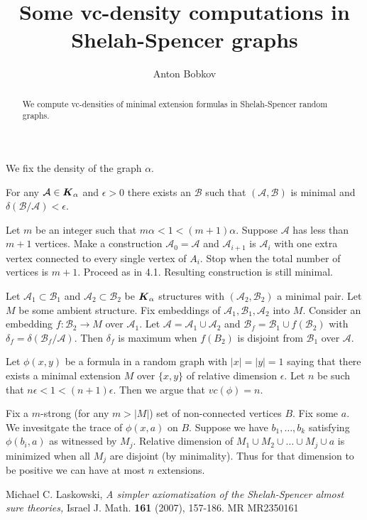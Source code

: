 \documentclass{amsart}
\newcommand{\A}{\mathcal A}
\newcommand{\B}{\mathcal B}
\newcommand{\K}{\boldface K_\alpha}
\begin{document}
\title{Some vc-density computations in Shelah-Spencer graphs}
\author{Anton Bobkov}

\begin{abstract}
	We compute vc-densities of minimal extension formulas in Shelah-Spencer random graphs.
\end{abstract}

\maketitle

We fix the density of the graph $\alpha$.

\begin{Lemma}
	For any $\A \in \K$ and $\epsilon > 0$ there exists an $\B$ such that $(\A, \B)$ is minimal and $\delta(\B/\A) < \epsilon$.
\end{Lemma}

\begin{Proof}
	Let $m$ be an integer such that $m\alpha < 1 < (m+1)\alpha$. Suppose $\A$ has less than $m+1$ vertices. Make a construction $\A_0 = \A$ and $\A_{i+1}$ is $\A_i$ with one extra vertex connected to every single vertex of $A_i$. Stop when the total number of vertices is $m+1$. Proceed as in \cite{Laskowski} 4.1. Resulting construction is still minimal.
\end{Proof}

\begin{Lemma}
	Let $\A_1 \subset \B_1$ and $\A_2 \subset \B_2$ be $\K$ structures with $(\A_2, \B_2)$ a minimal pair. Let $M$ be some ambient structure. Fix embeddings of $\A_1, \B_1, \A_2$ into $M$. Consider an embedding $f \colon \B_2 \to M$ over $\A_1$. Let $\A = \A_1 \cup \A_2$ and $\B_f = \B_1 \cup f(\B_2)$ with $\delta_f = \delta(\B_f/\A)$. Then $\delta_f$ is maximum when $f(B_2)$ is disjoint from $\B_1$ over $\A$.
\end{Lemma}



Let $\phi(x,y)$ be a formula in a random graph with $|x|=|y|=1$ saying that there exists a minimal extension $M$ over $\{x,y\}$ of relative dimension $\epsilon$. Let $n$ be such that $n\epsilon < 1 < (n+1)\epsilon$. Then we argue that $vc(\phi) = n$.

Fix a $m$-strong (for any $m > |M|$) set of non-connected vertices $B$. Fix some $a$. We invesitgate the trace of $\phi(x, a)$ on $B$. Suppose we have $b_1, \ldots, b_k$ satisfying $\phi(b_i, a)$ as witnessed by $M_j$. Relative dimension of $M_1 \cup M_2 \cup \ldots \cup M_j \cup {a}$ is minimized when all $M_j$ are disjoint (by minimality). Thus for that dimension to be positive we can have at most $n$ extensions.

\begin{thebibliography}{9}

	Michael C. Laskowski, \textsl{A simpler axiomatization of the Shelah-Spencer almost sure theories,}
	Israel J. Math. \textbf{161} (2007), 157-186. MR MR2350161

\end{thebibliography}
\end{document}
